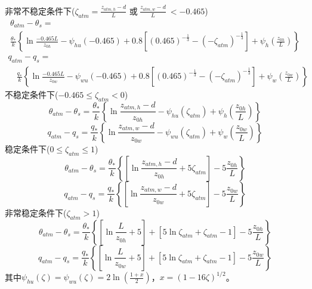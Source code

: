 \noindent 非常不稳定条件下($\zeta_{atm}=\frac{z_{atm,h}-d}{L}$ 或$ \ \frac{z_{atm,w}-d}{L}\ <-0.465$)
\begin{equation}\label{theta_VU}
\begin{array}{l}\theta_{atm}-\theta_{s}= \\ 
     \frac{\theta_{*}}{k}\left\{\ln \frac{-0.465 L}{z_{0 h}}-\psi_{hu}(-0.465)+0.8\left[(0.465)^{-\frac{1}{3}}-\left(-\zeta_{atm}\right)^{-\frac{1}{3}}\right]
     +\psi_{h}\left(\frac{z_{0 h}}{L}\right)\right\}\end{array}
\end{equation}
\begin{equation}\label{q_VU}
\begin{array}{l}q_{atm}-q_{s}= \\ 
     \quad \frac{q_{*}}{k}\left\{\ln \frac{-0.465 L}{z_{0 w}}-\psi_{wu}(-0.465)+0.8\left[(0.465)^{-\frac{1}{3}}-
     \left(-\zeta_{atm}\right)^{-\frac{1}{3}}\right]+\psi_{w}\left(\frac{z_{0 w}}{L}\right)\right\}\end{array}
\end{equation}
不稳定条件下($-0.465\le\zeta_{atm}<0$)
\begin{equation}
\theta_{atm}-\theta_{s}=\frac{\theta_{*}}{k}\left\{\ln \frac{z_{atm, h}-d}{z_{0 h}}-\psi_{hu}
\left(\zeta_{atm}\right)+\psi_{h}\left(\frac{z_{0 h}}{L}\right)\right\}
\end{equation}
\begin{equation}
q_{atm}-q_{s}=\frac{q_{*}}{k}\left\{\ln \frac{z_{atm, w}-d}{z_{0 w}}-
\psi_{wu}\left(\zeta_{atm}\right)+\psi_{w}\left(\frac{z_{0 w}}{L}\right)\right\}
\end{equation}
稳定条件下($0\le\zeta_{atm}\le1$)
\begin{equation}
\theta_{atm}-\theta_{s}=\frac{\theta_{*}}{k}\left\{\left[\ln \frac{z_{atm, h}-d}{z_{0 h}}+5 \zeta_{atm}\right]-5 \frac{z_{0 h}}{L}\right\}
\end{equation}
\begin{equation}
q_{atm}-q_{s}=\frac{q_{*}}{k}\left\{\left[\ln \frac{z_{atm, w}-d}{z_{0 w}}+5 \zeta_{atm}\right]-5 \frac{z_{0 w}}{L}\right\}
\end{equation}
非常稳定条件下($\zeta_{atm}>1$)
\begin{equation}\label{theta_VS}
\theta_{atm}-\theta_{s}=\frac{\theta_{*}}{k}\left\{\left[\ln \frac{L}{z_{0 h}}+5\right]
+\left[5 \ln \zeta_{atm}+\zeta_{atm}-1\right]-5 \frac{z_{0 h}}{L}\right\}
\end{equation}
\begin{equation}\label{q_VS}
q_{atm}-q_{s}=\frac{q_{*}}{k}\left\{\left[\ln \frac{L}{z_{0 w}}+5\right]
+\left[5 \ln \zeta_{atm}+\zeta_{atm}-1\right]-5 \frac{z_{0 w}}{L}\right\}
\end{equation}
其中$\psi_{hu}\left(\zeta\right)=\psi_{wu}\left(\zeta\right)=2\ln{\left(\frac{1+x}{2}\right)}$，$x={(1-16\zeta)}^{1/2}$。

